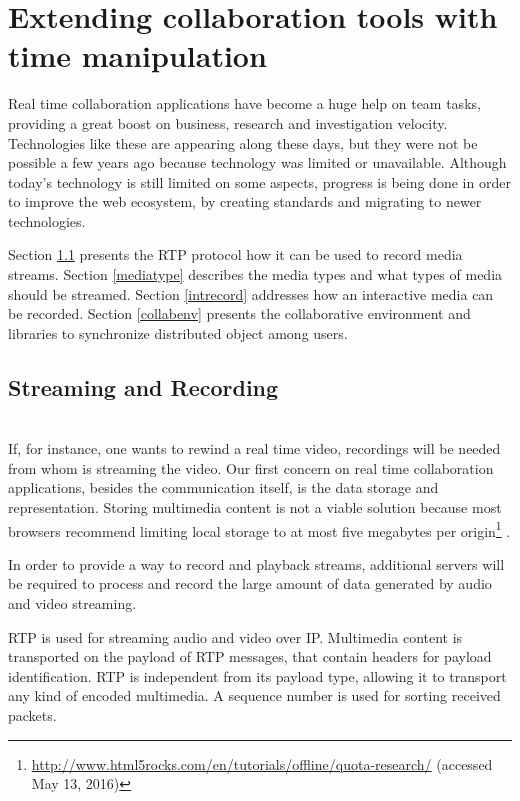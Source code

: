 \section{Extending collaboration tools with time manipulation}
\label{collab}

Real time collaboration applications have become a huge help on team tasks, providing a great boost on business, research and investigation velocity. Technologies like these are appearing along these days, but they were not be possible a few years ago because technology was limited or unavailable. Although today's technology is still limited on some aspects, progress is being done in order to improve the web ecosystem, by creating standards and migrating to newer technologies.

Section \ref{recstream} presents the RTP protocol how it can be used to record media streams. Section \ref{mediatype} describes the media types and what types of media should be streamed. Section \ref{intrecord} addresses how an interactive media can be recorded. Section \ref{collabenv} presents the collaborative environment and libraries to synchronize distributed object among users.

\subsection{Streaming and Recording}\label{recstream}~\\
	If, for instance, one wants to rewind a real time video, recordings will be needed from whom is streaming the video. 
 Our first concern on real time collaboration applications, besides the communication itself, is the data storage and representation. Storing multimedia content is not a viable solution because most browsers recommend limiting local storage to at most five megabytes per origin\footnote{\url{http://www.html5rocks.com/en/tutorials/offline/quota-research/} (accessed May 13, 2016)} .

 	In order to provide a way to record and playback streams, additional servers will be required to process and record the large amount of data generated by audio and video streaming.

 \ac{RTP}\cite{rfc3550} is used for streaming audio and video over \ac{IP}.
 Multimedia content is transported on the payload of \ac{RTP} messages, that contain headers for payload identification. \ac{RTP} is independent from its payload type, allowing it to transport any kind of encoded multimedia. A sequence number is used for sorting received packets.

